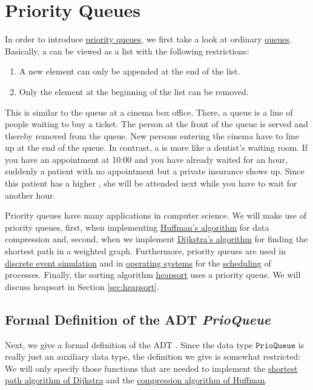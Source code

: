 \chapter{Priority Queues \label{chap:prioqueue}}
In order to introduce \href{https://en.wikipedia.org/wiki/Priority_queue}{priority queues},
we first take a look at ordinary
\href{https://en.wikipedia.org/wiki/Queue_(abstract_data_type)}{queues}.
Basically, a  can be viewed as a list with the following restrictions:
\begin{enumerate}
\item A new element can only be appended at the end of the list.
\item Only the element at the beginning of the list can be removed.
\end{enumerate}
This is similar to the queue at a cinema box office.  There, a queue is a line of people
waiting to buy a ticket.  The person at the front of the queue is served and thereby removed from
the queue.  New persons entering the cinema have to line up at the end of the queue.  In contrast, a
 is more like a dentist's waiting room.  If you have an appointment at 10:00 and you
have already waited for an hour, suddenly a patient with no appointment but a private insurance
shows up.  Since this patient has a higher , she will be attended next while you have
to wait for another hour. 

Priority queues have many applications in computer science.  We will make use of priority queues,
first, when implementing \href{https://en.wikipedia.org/wiki/Huffman_coding}{Huffman's algorithm}
for data compression and, second, when we implement
\href{https://en.wikipedia.org/wiki/Dijkstra%27s_algorithm}{Dijkstra's algorithm} 
for finding the shortest path in a weighted graph.  Furthermore, priority 
queues are used in \href{https://en.wikipedia.org/wiki/Discrete_event_simulation}{discrete event simulation}
and in \href{https://en.wikipedia.org/wiki/Operating_system}{operating systems} for the
\href{https://en.wikipedia.org/wiki/Scheduling_(computing)}{scheduling} of 
processes. Finally, the sorting algorithm \href{https://en.wikipedia.org/wiki/Heapsort}{heapsort} uses a
priority queue. We will discuss heapsort in Section \ref{sec:heapsort}.

\section[Formal Definition]{Formal Definition of the ADT \textsl{PrioQueue}}
Next, we give a formal definition of the ADT .  Since the data type
$\texttt{PrioQueue}$ is really just an auxiliary data type, the definition we give is somewhat
restricted: We will only specify those functions that are needed to implement
the \hyperref[sec:dijkstra]{shortest path algorithm of Dijkstra} and the
\hyperref[sec:huffman]{compression algorithm of Huffman}.

